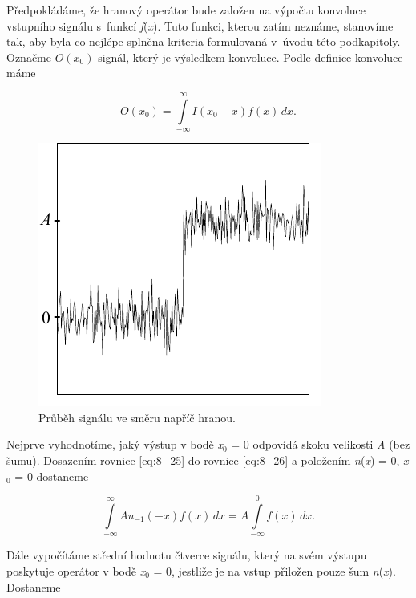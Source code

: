 Předpokládáme, že hranový operátor bude založen na výpočtu konvoluce vstupního signálu s~funkcí \textit{f}(\textit{x}). Tuto funkci, kterou zatím neznáme, stanovíme tak, aby byla co nejlépe splněna kriteria formulovaná v~úvodu této podkapitoly. Označme $O(x_0)$ signál, který je výsledkem konvoluce. Podle definice konvoluce máme

\begin{equation} \label{eq:8_26}
    O(x_0) = \int\limits_{-\infty}^{\infty} I(x_0 - x) f(x)\,dx .
\end{equation}

\begin{figure}[th]
    \begin{center}
        \includegraphics[scale=0.9]{08_segmentace/images/img_8_13.pdf}
    \end{center}
    \caption{Průběh signálu ve směru napříč hranou.}
    \label{img:8_13}
\end{figure}

Nejprve vyhodnotíme, jaký výstup v bodě \textit{x}$_0$ = 0 odpovídá skoku velikosti \textit{A} (bez šumu). Dosazením rovnice \eqref{eq:8_25} do rovnice \eqref{eq:8_26} a položením \textit{n}(\textit{x}) = 0, \textit{x}$_0$ = 0 dostaneme

\begin{equation} \label{eq:8_27}
    \int\limits_{-\infty}^{\infty} Au_{-1}(-x)f(x)\,dx = A \int\limits_{-\infty}^{0} f(x)\,dx .
\end{equation}

Dále vypočítáme střední hodnotu čtverce signálu, který na svém výstupu poskytuje operátor v bodě \textit{x}$_0$ = 0, jestliže je na vstup přiložen pouze šum \textit{n}(\textit{x}). Dostaneme 

